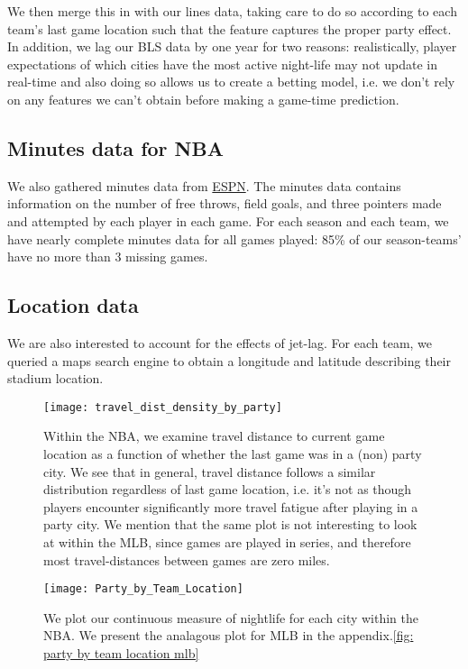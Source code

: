 \documentclass[letterpaper,12pt]{article}
\begin{document}
We then merge this in with our lines data, taking care to do so according to each team's last game location such that the feature captures the proper
party effect. In addition, we lag our BLS data by one year for two reasons:
realistically, player expectations of which cities have the most active night-life may not
update in real-time and also doing so allows us to create a betting model, i.e.
we don't rely on any features we can't obtain before making a game-time prediction. 

\subsection{Minutes data for NBA}
We also gathered minutes data from \href{http://www.espn.com/nba/scoreboard/_/date/}{ESPN}.
The minutes data contains information on the number of free throws, field goals, and three pointers made and attempted by each player in each game.
For each season and each team, we have nearly complete 
minutes data for all games played: 85\% of our season-teams' have no more than 3 missing games.

\subsection{Location data} We are also interested
to account for the effects of jet-lag. For each team, we queried
a maps search engine to obtain a longitude and latitude describing their
stadium location.\citep{ggmap}

\begin{figure}
  \centering
  \texttt{[image: travel\_dist\_density\_by\_party]}
  \label{fig: density by party}
  \caption{Within the NBA, we examine travel distance to current game location as a function of
    whether the last game was in a (non) party city. We see that in general,
  travel distance follows a similar distribution regardless of last game location, i.e. 
  it's not as though players encounter significantly
  more travel fatigue after playing in a party city. We mention that the same plot is not interesting to look at within the MLB, since games are played in series, and therefore most travel-distances between games are zero miles.}
\end{figure}


\begin{figure}
  \centering
  \label{fig: party by team loc}
  \texttt{[image: Party\_by\_Team\_Location]}
  \caption{We plot our continuous measure of nightlife for each city within the NBA. We present the analagous plot for MLB in the appendix.\ref{fig: party by team location mlb}}
\end{figure}
\end{document}
